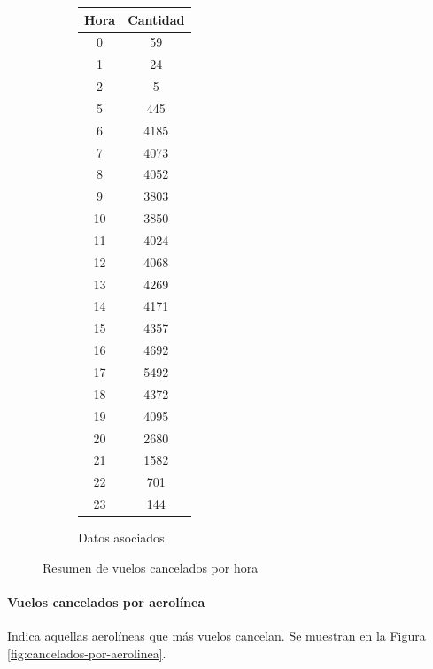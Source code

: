\documentclass[12pt]{article}
\numberwithin{equation}{section}
\numberwithin{table}{section}
\numberwithin{figure}{section}
\begin{document}
\begin{figure}
\begin{subfigure}[b]{0.3\textwidth}
\begin{tabular}{@{}cc@{}}
\toprule
\textbf{Hora} & \textbf{Cantidad} \\ \midrule
0             & 59                \\
1             & 24                \\
2             & 5                 \\
5             & 445               \\
6             & 4185              \\
7             & 4073              \\
8             & 4052              \\
9             & 3803              \\
10            & 3850              \\
11            & 4024              \\
12            & 4068              \\
13            & 4269              \\
14            & 4171              \\
15            & 4357              \\
16            & 4692              \\
17            & 5492              \\
18            & 4372              \\
19            & 4095              \\
20            & 2680              \\
21            & 1582              \\
22            & 701               \\
23            & 144               \\ \bottomrule
\end{tabular}
                \caption{Datos asociados}
        \end{subfigure}
        \caption{Resumen de vuelos cancelados por hora}
        \label{fig:cancelados-por-hora}
\end{figure}

\paragraph{Vuelos cancelados por aerolínea}
Indica aquellas aerolíneas que más vuelos cancelan.
Se muestran en la Figura \ref{fig:cancelados-por-aerolinea}.
\end{document}
